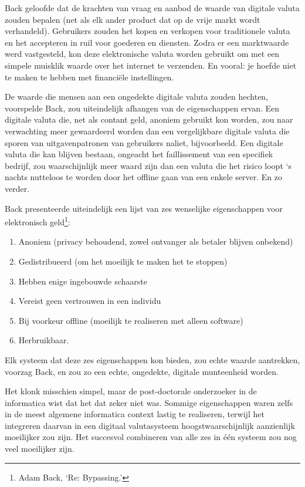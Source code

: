 \documentclass[
  a5paper,
  smalldemyvopaper,11pt,twoside,onecolumn,openright,extrafontsizes,
hidelinks]{memoir}
\providecommand{\tightlist}{%
  \setlength{\itemsep}{0pt}\setlength{\parskip}{0pt}}\usepackage{longtable,booktabs,array}
\begin{document}
Back geloofde dat de krachten van vraag en aanbod de waarde van digitale
valuta zouden bepalen (net als elk ander product dat op de vrije markt
wordt verhandeld). Gebruikers zouden het kopen en verkopen voor
traditionele valuta en het accepteren in ruil voor goederen en diensten.
Zodra er een marktwaarde werd vastgesteld, kon deze elektronische valuta
worden gebruikt om met een simpele muisklik waarde over het internet te
verzenden. En vooral: je hoefde niet te maken te hebben met financiële
instellingen.

De waarde die mensen aan een ongedekte digitale valuta zouden hechten,
voorspelde Back, zou uiteindelijk afhangen van de eigenschappen ervan.
Een digitale valuta die, net als contant geld, anoniem gebruikt kon
worden, zou naar verwachting meer gewaardeerd worden dan een
vergelijkbare digitale valuta die sporen van uitgavenpatronen van
gebruikers naliet, bijvoorbeeld. Een digitale valuta die kan blijven
bestaan, ongeacht het faillissement van een specifiek bedrijf, zou
waarschijnlijk meer waard zijn dan een valuta die het risico loopt `s
nachts nutteloos te worden door het offline gaan van een enkele server.
En zo verder.

Back presenteerde uiteindelijk een lijst van zes wenselijke
eigenschappen voor elektronisch geld\footnote{Adam Back, `Re:
  Bypassing.'}:

\begin{enumerate}
\def\labelenumi{\arabic{enumi}.}
\tightlist
\item
  Anoniem (privacy behoudend, zowel ontvanger als betaler blijven
  onbekend)
\item
  Gedistribueerd (om het moeilijk te maken het te stoppen)
\item
  Hebben enige ingebouwde schaarste
\item
  Vereist geen vertrouwen in een individu
\item
  Bij voorkeur offline (moeilijk te realiseren met alleen software)
\item
  Herbruikbaar.
\end{enumerate}

Elk systeem dat deze zes eigenschappen kon bieden, zou echte waarde
aantrekken, voorzag Back, en zou zo een echte, ongedekte, digitale
munteenheid worden.

Het klonk misschien simpel, maar de post-doctorale onderzoeker in de
informatica wist dat het dat zeker niet was. Sommige eigenschappen waren
zelfs in de meest algemene informatica context lastig te realiseren,
terwijl het integreren daarvan in een digitaal valutasysteem
hoogstwaarschijnlijk aanzienlijk moeilijker zou zijn. Het succesvol
combineren van alle zes in één systeem zou nog veel moeilijker zijn.
\end{document}
